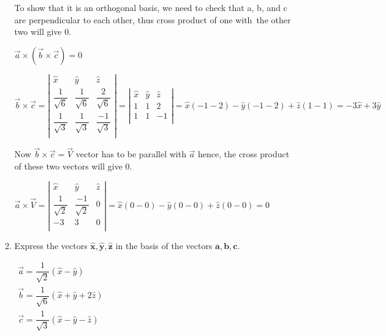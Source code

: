 \documentclass[fleqn]{article}
\begin{document}
\begin{enumerate}
\begin{enumerate}
\bigbreak

To show that it is an orthogonal basis, we need to check that a, b, and c are perpendicular to each other, thus cross product of one with the other two will give 0.

\bigbreak

$
\overrightarrow{a}\times(\overrightarrow{b}\times\overrightarrow{c})=0
$

$
\overrightarrow{b}\times\overrightarrow{c}
=
\left|
\begin{matrix}
  \hat{x} & \hat{y} & \hat{z} \\
  \dfrac{1}{\sqrt{6}} & \dfrac{1}{\sqrt{6}} & \dfrac{2}{\sqrt{6}} \\ 
  \dfrac{1}{\sqrt{3}} & \dfrac{1}{\sqrt{3}} & \dfrac{-1}{\sqrt{3}} \\ 
\end{matrix}
\right|
=
\left|
\begin{matrix}
  \hat{x} & \hat{y} & \hat{z} \\
  1 & 1 & 2 \\ 
  1 & 1 & -1 \\ 
\end{matrix}
\right|
=
\hat{x}(-1-2)-\hat{y}(-1-2)+\hat{z}(1-1)
=
-3\hat{x}+3\hat{y}
$

Now $\overrightarrow{b}\times\overrightarrow{c}=\overrightarrow{V}$ vector has to be parallel with $\overrightarrow{a}$ hence, the cross product of these two vectors will give 0.

$
\overrightarrow{a}\times\overrightarrow{V}
=
\left|
\begin{matrix}
  \hat{x} & \hat{y} & \hat{z} \\
  \dfrac{1}{\sqrt{2}} & \dfrac{-1}{\sqrt{2}} & 0  \\ 
  -3 & 3 & 0 \\ 
\end{matrix}
\right|
=
\hat{x}(0-0)-\hat{y}(0-0)+\hat{z}(0-0)
=
0
$

\item Express the vectors $\mathbf{\hat{x}}, \mathbf{\hat{y}}, \mathbf{\hat{z}}$ in the basis of the vectors $\mathbf{a}, \mathbf{b}, \mathbf{c}$. 

$
\begin{array}{lll}
  \overrightarrow{a}= \dfrac{1}{\sqrt{2}}(\hat{x}-\hat{y}) \\
  \overrightarrow{b}= \dfrac{1}{\sqrt{6}}(\hat{x}+\hat{y}+2\hat{z}) \\
  \overrightarrow{c}= \dfrac{1}{\sqrt{3}}(\hat{x}-\hat{y}-\hat{z})
  \end{array}  
$


\end{enumerate}
\end{enumerate}
\end{document}
